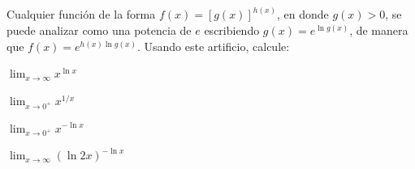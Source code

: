 \item Cualquier función de la forma $f(x) = [g(x)]^{h(x)}$, en donde $g(x) > 0$, se puede analizar como una potencia de $e$ escribiendo $g(x) = e^{\ln g(x)}$, de manera que $f(x) = e^{h(x) \ln g(x)}$. Usando este artificio, calcule:
\begin{enumerate}
    \begin{minipage}{0.45\textwidth}
    \item[(a)] $\displaystyle \lim_{x \to \infty} x^{\ln x}$
    \item[(c)] $\displaystyle \lim_{x \to 0^+} x^{1/x}$
    \end{minipage}%
    \begin{minipage}{0.45\textwidth}
    \item[(b)] $\displaystyle \lim_{x \to 0^+} x^{-\ln x}$
    \item[(d)] $\displaystyle \lim_{x \to \infty} (\ln 2x)^{-\ln x}$
    \end{minipage}
\end{enumerate}
